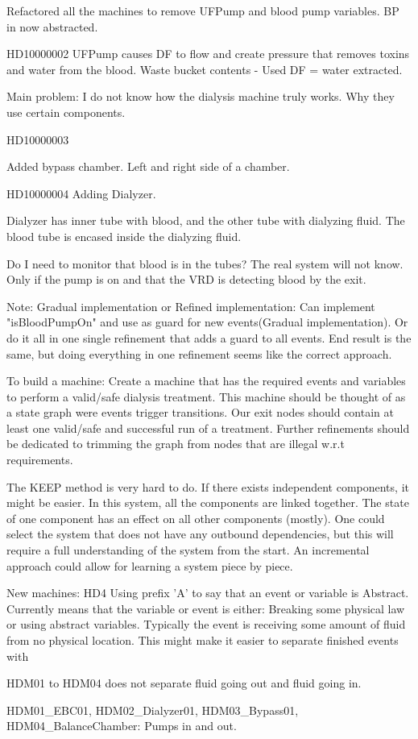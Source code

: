 Refactored all the machines to remove UFPump and blood pump variables. BP in now abstracted. 

HD10000002
UFPump causes DF to flow and create pressure that removes toxins and water from the blood. Waste bucket contents - Used DF = water extracted.

Main problem: I do not know how the dialysis machine truly works. Why they use certain components.


HD10000003

Added bypass chamber. Left and right side of a chamber.


HD10000004
Adding Dialyzer.

Dialyzer has inner tube with blood, and the other tube with dialyzing fluid. The blood tube is encased inside the dialyzing fluid. 

Do I need to monitor that blood is in the tubes? The real system will not know. Only if the pump is on and that the VRD is detecting blood by the exit.

Note: Gradual implementation or Refined implementation: Can implement "isBloodPumpOn" and use as guard for new events(Gradual implementation). Or do it all in one single refinement that adds a guard to all events. End result is the same, but doing everything in one refinement seems like the correct approach. 

To build a machine:
Create a machine that has the required events and variables to perform a valid/safe dialysis treatment. This machine should be thought of as a state graph were events trigger transitions. Our exit nodes should contain at least one valid/safe and successful run of a treatment. Further refinements should be dedicated to trimming the graph from nodes that are illegal w.r.t requirements.

The KEEP method is very hard to do. If there exists independent components, it might be easier. In this system, all the components are linked together.  The state of one component has an effect on all other components (mostly). One could select the system that does not have any outbound dependencies, but this will require a full understanding of the system from the start. An incremental approach could allow for learning a system piece by piece. 



New machines: HD4
Using prefix 'A' to say that an event or variable is Abstract.
Currently means that the variable or event is either: Breaking some physical law or using abstract variables. Typically the event is receiving some amount of fluid from no physical location.  This might make it easier to separate finished events with  


HDM01 to HDM04 does not separate fluid going out and fluid going in.

HDM01_EBC01, HDM02_Dialyzer01, HDM03_Bypass01, HDM04_BalanceChamber:
Pumps in and out.









